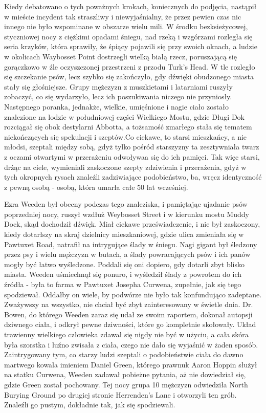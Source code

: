 Kiedy debatowano o tych poważnych krokach, koniecznych do podjęcia, nastąpił w mieście incydent tak straszliwy i niewyjaśnialny, że przez pewien czas nic innego nie było wspominane w obszarze wielu mili. W środku bezksieżycowej, styczniowej nocy z ciężkimi opadami śniegu, nad rzeką i wzgórzami rozległa się seria krzyków, która sprawiły, że śpiący pojawili się przy swoich oknach, a ludzie w okolicach Waybosset Point dostrzegli wielką białą rzecz, poruszającą się gorączkowo w źle oczyszczonej przestrzeni z przodu Turk's Head. W tle rozległo się szczekanie psów, lecz szybko się zakończyło, gdy dźwięki obudzonego miasta stały się głośniejsze. Grupy mężczyzn z muszkietami i latarniami ruszyły zobaczyć, co się wydarzyło, lecz ich poszukiwania niczego nie przyniosły. Następnego poranka, jednakże, wielkie, umięśnione i nagie ciało zostało znalezione na lodzie w południowej części Wielkiego Mostu, gdzie Długi Dok rozciągał się obok destylarni Abbotta, a tożsamość zmarłego stała się tematem niekończących się spekulacji i szeptów.Co ciekawe, to starsi mieszkańcy, a nie młodsi, szeptali między sobą, gdyż tylko pośród starszyzny ta zesztywniała twarz z oczami otwartymi w przerażeniu odwoływaa się do ich pamięci. Tak więc starsi, drżąc na ciele, wymieniali zaskoczone szepty zdziwienia i przerażenia, gdyż w tych okropnych rysach znaleźli zadziwiające podobieństwo, ba, wręcz identyczność z pewną osobą - osobą, która umarła całe 50 lat wcześniej.

Ezra Weeden był obecny podczas tego znaleziska, i pamiętając ujadanie psów poprzedniej nocy, ruszył wzdłuż Weybosset Street i w kierunku mostu Muddy Dock, skąd dochodził dźwięk. Miał ciekawe przeświadczenie, i nie był zaskoczony, kiedy dotarłszy na skraj dzielnicy mieszkaniowej, gdzie ulica zmieniała się w Pawtuxet Road, natrafił na intrygujące ślady w śniegu. Nagi gigant był śledzony przez psy i wielu mężczyzn w butach, a ślady powracających psów i ich panów mogły być łatwo wyśledzone. Poddali się oni dopiero, gdy dotarli zbyt blisko miasta. Weeden uśmiechnął się ponuro, i wyśledził ślady z powrotem do ich źródła - była to farma w Pawtuxet Josepha Curwena, zupełnie, jak się tego spodziewał. Oddałby on wiele, by podwórze nie było tak konfundująco zadeptane. Zważywszy na wszystko, nie chciał być zbyt zainteresowany w świetle dnia. Dr. Bowen, do którego Weeden zaraz się udał ze swoim raportem, dokonał autopsji dziwnego ciała, i odkrył pewne dziwności, które go kompletnie skołowały. Układ trawienny wielkiego człowieka zdawał się nigdy nie być w użyciu, a cała skóra była szorstka i luźno zwisała z ciała, czego nie dało się wyjaśnić w żaden sposób. Zaintrygowany tym, co starzy ludzi szeptali o podobieństwie ciała do dawno martwego kowala imieniem Daniel Green, którego prawnuk Aaron Hoppin służył na statku Curwena, Weeden zadawał pobieżne pytania, aż nie dowiedział się, gdzie Green został pochowany. Tej nocy grupa 10 mężczyzn odwiedziła North Burying Ground po drugiej stronie Herrenden's Lane i otworzyli ten grób. Znaleźli go pustym, dokładnie tak, jak się spodziewali.

